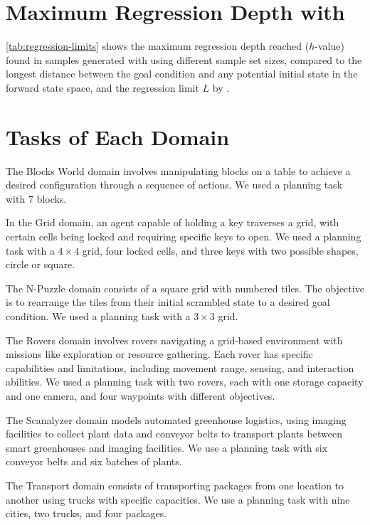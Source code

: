 \documentclass[ppgc,diss,english]{iiufrgs}
\begin{document}
\chapter{Maximum Regression Depth with \bfsrs}
\label{cha:max_reg_depth}

\cref{tab:regression-limits} shows the maximum regression depth reached ($h$-value) found in samples generated with \bfsrs using different sample set sizes, compared to the longest distance \distfarthest between the goal condition and any potential initial state in the forward state space, and the regression limit $L$ by \citet{Bettker.etal/2022}.



\chapter{Tasks of Each Domain}
\label{cha:tasks_each_domain}
The Blocks World domain involves manipulating blocks on a table to achieve a desired configuration through a sequence of actions. We used a planning task with $7$ blocks.

In the Grid domain, an agent capable of holding a key traverses a grid, with certain cells being locked and requiring specific keys to open. We used a planning task with a $4 \times 4$ grid, four locked cells, and three keys with two possible shapes, circle or square.

The N-Puzzle domain consists of a square grid with numbered tiles. The objective is to rearrange the tiles from their initial scrambled state to a desired goal condition. We used a planning task with a $3 \times 3$ grid.

The Rovers domain involves rovers navigating a grid-based environment with missions like exploration or resource gathering. Each rover has specific capabilities and limitations, including movement range, sensing, and interaction abilities. We used a planning task with two rovers, each with one storage capacity and one camera, and four waypoints with different objectives.

The Scanalyzer domain models automated greenhouse logistics, using imaging facilities to collect plant data and conveyor belts to transport plants between smart greenhouses and imaging facilities. We use a planning task with six conveyor belts and six batches of plants.

The Transport domain consists of transporting packages from one location to another using trucks with specific capacities. We use a planning task with nine cities, two trucks, and four packages.
\end{document}
